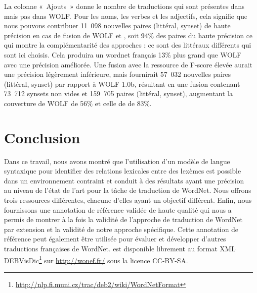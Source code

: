 La colonne «~Ajouts~» donne le nombre de traductions qui sont présentes dans \newjaws{} mais pas dans WOLF. Pour les noms, les verbes et les adjectifs, cela signifie que nous pouvons contribuer 11~098 nouvelles paires (littéral, synset) de haute précision en cas de fusion de WOLF et \newjaws{}, soit 94\% des paires du \newjaws{} haute précision ce qui montre la complémentarité des approches : ce sont des littéraux différents qui sont ici choisis. Cela produira un wordnet français 13\% plus grand que WOLF avec une précision améliorée. Une fusion avec la ressource de F-score élevée aurait une précision légèrement inférieure, mais fournirait 57~032 nouvelles paires (littéral, synset) par rapport à WOLF 1.0b, résultant en une fusion contenant 73~712 synsets non vides et 159~705 paires (littéral, synset), augmentant la couverture de WOLF de 56\% et celle de \newjaws{} de 83\%.


\section*{Conclusion}

Dans ce travail, nous avons montré que l'utilisation d'un modèle de langue syntaxique pour identifier des relations lexicales entre des lexèmes est possible dans un environnement contraint et conduit à des résultats ayant une précision au niveau de l'état de l'art pour la tâche de traduction de WordNet. Nous offrons trois ressources différentes, chacune d'elles ayant un objectif différent. Enfin, nous fournissons une annotation de référence validée de haute qualité qui nous a permis de montrer à la fois la validité de l'approche de traduction de WordNet par extension et la validité de notre approche spécifique. Cette annotation de référence peut également être utilisée pour évaluer et développer d'autres traductions françaises de WordNet. \newjaws{} est disponible librement au format XML DEBVisDic\footnote{\url{http://nlp.fi.muni.cz/trac/deb2/wiki/WordNetFormat}} sur \url{http://wonef.fr/} sous la licence CC-BY-SA.

